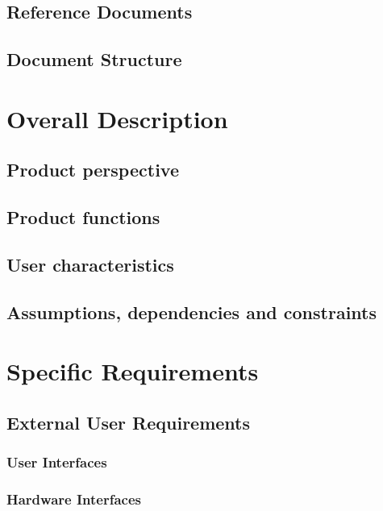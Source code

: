     \section{Reference Documents}
        
    \section{Document Structure}
    	
    
\newpage
\chapter{Overall Description}
    \section{Product perspective}
        
    \section{Product functions}
    	
    \section{User characteristics}
    	
    \section{Assumptions, dependencies and constraints}
    	
    
\newpage
\chapter{Specific Requirements}
    \section{External User Requirements}
        \subsection{User Interfaces}
        	
       	\newpage
        \subsection{Hardware Interfaces}
        	
